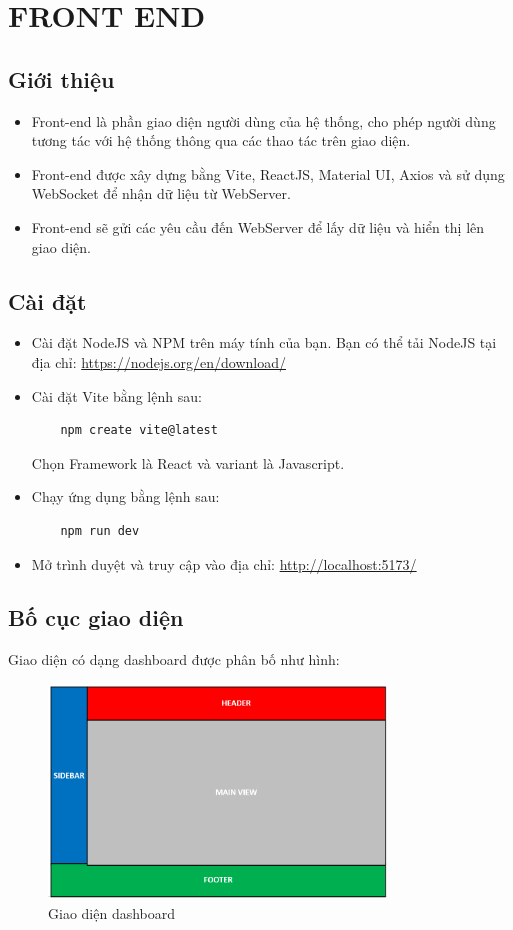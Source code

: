 \chapter{FRONT END}
    \section{Giới thiệu}
        \begin{itemize}
            \item Front-end là phần giao diện người dùng của hệ thống, cho phép người dùng tương tác với hệ thống thông qua các thao tác trên giao diện.
            \item Front-end được xây dựng bằng Vite, ReactJS, Material UI, Axios và sử dụng WebSocket để nhận dữ liệu từ WebServer. 
            \item Front-end sẽ gửi các yêu cầu đến WebServer để lấy dữ liệu và hiển thị lên giao diện.
        \end{itemize}
    \section{Cài đặt}
        \begin{itemize}
            \item Cài đặt NodeJS và NPM trên máy tính của bạn. Bạn có thể tải NodeJS tại địa chỉ: \url{https://nodejs.org/en/download/}
            \item Cài đặt Vite bằng lệnh sau:
                \begin{lstlisting}
    npm create vite@latest
                \end{lstlisting}
                Chọn Framework là React và variant là Javascript.
            \item Chạy ứng dụng bằng lệnh sau:
                \begin{lstlisting}
    npm run dev
                \end{lstlisting}
            \item Mở trình duyệt và truy cập vào địa chỉ: \url{http://localhost:5173/}
        \end{itemize}
    \section{Bố cục giao diện}
        Giao diện có dạng dashboard được phân bố như hình:
        \begin{figure}[H]
            \centering
            \includegraphics[width=0.8\textwidth]{pictures/dashboard.png}
            \caption{Giao diện dashboard}
            \label{fig:dashboard}
        \end{figure}
